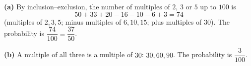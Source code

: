 \textbf{(a)} By inclusion--exclusion, the number of multiples of $2$, $3$ or $5$ up to $100$ is
\[
50+33+20-16-10-6+3=74
\]
(multiples of $2,3,5$; minus multiples of $6,10,15$; plus multiples of $30$). The probability is $\dfrac{74}{100}=\boxed{\dfrac{37}{50}}$.

\textbf{(b)} A multiple of all three is a multiple of $30$: $30,60,90$. The probability is $\boxed{\dfrac{3}{100}}$.
